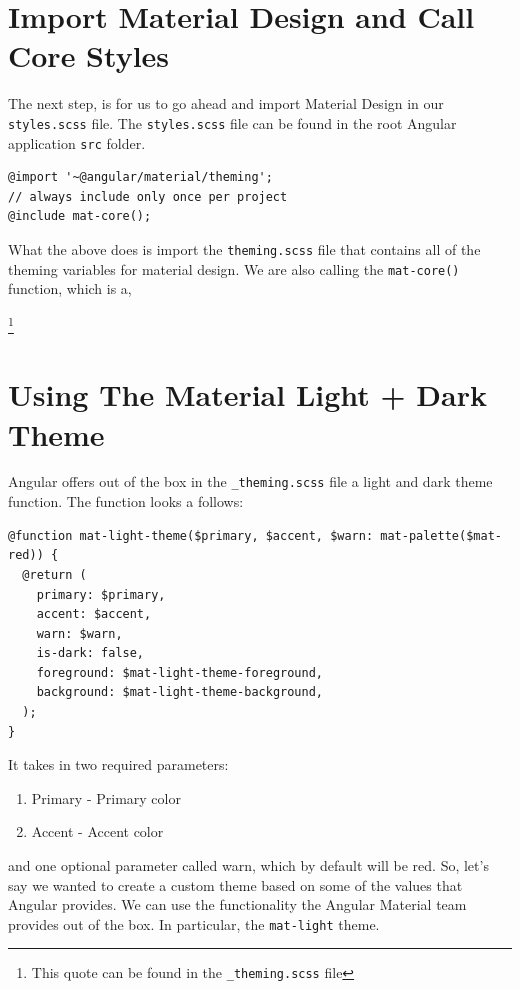 \section{Import Material Design and Call Core Styles}
The next step, is for us to go ahead and import Material Design in our 
\lstinline{styles.scss} file. The \lstinline{styles.scss} file can be found
in the root Angular application \lstinline{src} folder.

\begin{lstlisting}[caption=styles.scss]
@import '~@angular/material/theming';
// always include only once per project
@include mat-core();
\end{lstlisting}


What the above does is import the \lstinline{theming.scss} file that contains
all of the theming variables for material design. We are also calling the
\lstinline{mat-core()} function, which is a, \begin{quote}
\end{quote} \footnote{This quote can be found in the \lstinline{_theming.scss}
file}

\section{ Using The Material Light + Dark Theme}
Angular offers out of the box in the \lstinline{_theming.scss} file a light and
dark theme function. The function looks a follows: 
\begin{lstlisting}
@function mat-light-theme($primary, $accent, $warn: mat-palette($mat-red)) {
  @return (
    primary: $primary,
    accent: $accent,
    warn: $warn,
    is-dark: false,
    foreground: $mat-light-theme-foreground,
    background: $mat-light-theme-background,
  );
}  
\end{lstlisting}

It takes in two required parameters: 
\begin{enumerate}
  \item Primary - Primary color
  \item Accent - Accent color 
\end{enumerate}
and one optional parameter called warn, which by default will be red. So, let's
say we wanted to create a custom theme based on some of the values that 
Angular provides. We can use the functionality the Angular Material team 
provides out of the box. In particular, the \lstinline{mat-light} theme.

